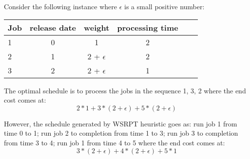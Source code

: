 \documentclass[12pt]{article}
\begin{document}
\begin{enumerate}
Consider the following instance where $\epsilon$ is a small positive number:
\begin{center}
\begin{tabular}{l*{4}{c}r}
Job  & release date & weight & processing time \\
\hline
1    & 0 & 1 & 2               \\
2    & 1 & 2 + $\epsilon$ & 2  \\
3    & 2 & 2 + $\epsilon$ & 1  \\
\end{tabular}
\end{center}

The optimal schedule is to process the jobs in the sequence 1, 3, 2 where the end cost comes at:
\begin{equation}
2*1 + 3 * (2 + \epsilon) + 5 * (2 + \epsilon)
\end{equation}

However, the schedule generated by WSRPT heuristic goes as: run job 1 from time 0 to 1; run job 2 to completion from time 1 to 3; run job 3 to completion from time 3 to 4; run job 1 from time 4 to 5 where the end cost comes at:
\begin{equation}
3 * (2 + \epsilon) + 4 * (2 + \epsilon) + 5 * 1
\end{equation}

\end{enumerate}
\end{document}
